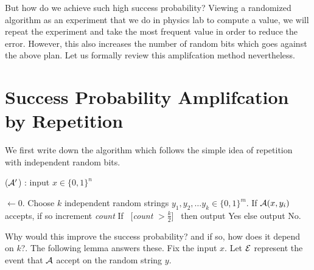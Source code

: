 But how do we achieve such high success probability? Viewing a randomized algorithm as an experiment that we do in physics lab to compute a value, we will repeat the experiment and take the most frequent value in order to reduce the error. However, this also increases the number of random bits which goes against the above plan. Let us formally review this amplifcation method nevertheless.

\section{Success Probability Amplifcation by Repetition}

We first write down the algorithm which follows the simple idea of repetition with independent random bits.

\begin{algorithm}
\label{alg:trivial-amplification}
\caption{(${\cal{A}'}$) : input $x \in \{0,1\}^n$} 
\begin{algorithmic}[1]
 $\gets 0$.
\State Choose $k$ independent random strings $y_1, y_2, \ldots y_k \in \{0,1\}^m$. 
	\State If ${\cal{A}}(x,y_i)$ accepts, if so increment {\em count}
\EndFor
\State If ~[{\em count} $> \frac{k}{2}$]~ then output {\sc Yes} else output {\sc No}.
\end{algorithmic}
\end{algorithm}

Why would this improve the success probability? and if so, how does it depend on $k$?. The following lemma answers these. Fix the input $x$. Let ${\cal{E}}$ represent the event that ${\cal{A}}$ accept on the random string $y$.

